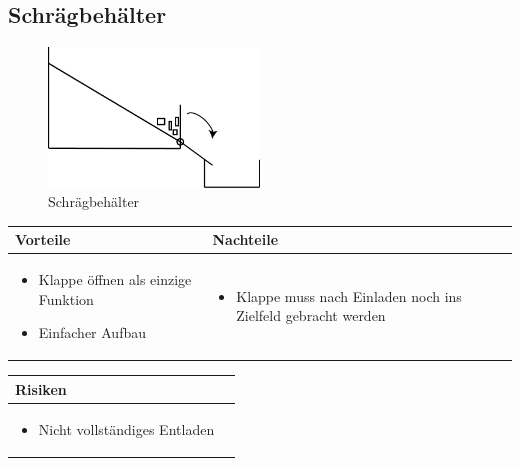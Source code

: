 \pagebreak


\subsection{Schrägbehälter}

\begin{figure} [hbp]
	\centering
	\includegraphics[width=0.5\textwidth]{fig/Entladen_Schraegbehaelter.png}
	\caption{Schrägbehälter}
\end{figure}

\begin{table}[h]
\begin{tabular}{p{} | p{}}


 \textbf{Vorteile} & \textbf{Nachteile} \\ \hline
	 
\begin{itemize}
\item Klappe öffnen als einzige Funktion
\item Einfacher Aufbau
\end{itemize}

 
 &
 
\begin{itemize}
\item Klappe muss nach Einladen noch ins Zielfeld gebracht werden
\end{itemize}

\end{tabular}
\end{table}

\begin{table}[h]
\begin{tabular}{p{}p{}}


 \textbf{Risiken} & \\ \hline
	 
\begin{itemize}
\item Nicht vollständiges Entladen
\end{itemize}

 
\end{tabular}
\end{table}

\pagebreak